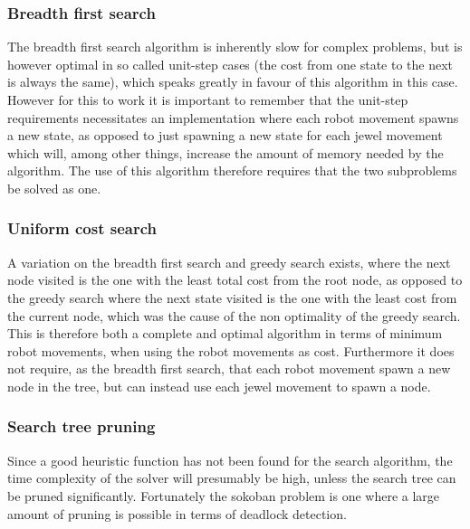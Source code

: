 \subsubsection*{Breadth first search}
The breadth first search algorithm is inherently slow for complex problems, but is however optimal in so called unit-step cases (the cost from one state to the next is always the same), which speaks greatly in favour of this algorithm in this case. However for this to work it is important to remember that the unit-step requirements necessitates an implementation where each robot movement spawns a new state, as opposed to just spawning a new state for each jewel movement which will, among other things, increase the amount of memory needed by the algorithm. The use of this algorithm therefore requires that the two subproblems be solved as one.

\subsubsection*{Uniform cost search}
A variation on the breadth first search and greedy search exists, where the next node visited is the one with the least total cost from the root node, as opposed to the greedy search where the next state visited is the one with the least cost from the current node, which was the cause of the non optimality of the greedy search. This is therefore both a complete and optimal algorithm in terms of minimum robot movements, when using the robot movements as cost. Furthermore it does not require, as the breadth first search, that each robot movement spawn a new node in the tree, but can instead use each jewel movement to spawn a node.

\subsubsection*{Search tree pruning}
Since a good heuristic function has not been found for the search algorithm, the time complexity of the solver will presumably be high, unless the search tree can be pruned significantly. Fortunately the sokoban problem is one where a large amount of pruning is possible in terms of deadlock detection. 

